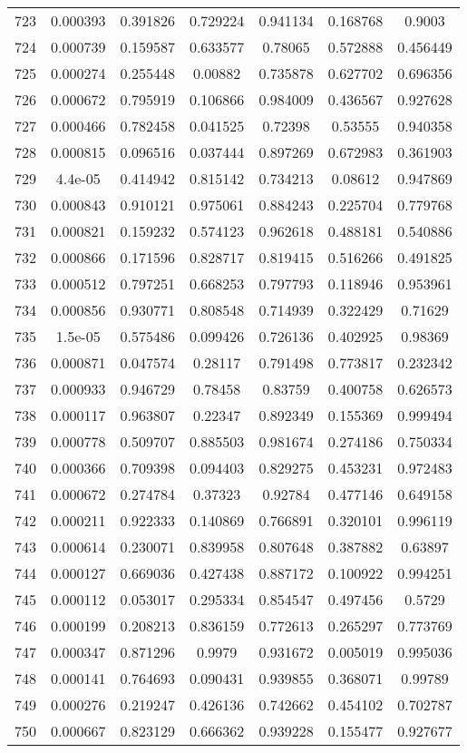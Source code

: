 \begin{table}
\begin{tabular}{c|c|c|c|c|c|c}
723 & 0.000393 & 0.391826 & 0.729224 & 0.941134 & 0.168768 & 0.9003\\
724 & 0.000739 & 0.159587 & 0.633577 & 0.78065 & 0.572888 & 0.456449\\
725 & 0.000274 & 0.255448 & 0.00882 & 0.735878 & 0.627702 & 0.696356\\
726 & 0.000672 & 0.795919 & 0.106866 & 0.984009 & 0.436567 & 0.927628\\
727 & 0.000466 & 0.782458 & 0.041525 & 0.72398 & 0.53555 & 0.940358\\
728 & 0.000815 & 0.096516 & 0.037444 & 0.897269 & 0.672983 & 0.361903\\
729 & 4.4e-05 & 0.414942 & 0.815142 & 0.734213 & 0.08612 & 0.947869\\
730 & 0.000843 & 0.910121 & 0.975061 & 0.884243 & 0.225704 & 0.779768\\
731 & 0.000821 & 0.159232 & 0.574123 & 0.962618 & 0.488181 & 0.540886\\
732 & 0.000866 & 0.171596 & 0.828717 & 0.819415 & 0.516266 & 0.491825\\
733 & 0.000512 & 0.797251 & 0.668253 & 0.797793 & 0.118946 & 0.953961\\
734 & 0.000856 & 0.930771 & 0.808548 & 0.714939 & 0.322429 & 0.71629\\
735 & 1.5e-05 & 0.575486 & 0.099426 & 0.726136 & 0.402925 & 0.98369\\
736 & 0.000871 & 0.047574 & 0.28117 & 0.791498 & 0.773817 & 0.232342\\
737 & 0.000933 & 0.946729 & 0.78458 & 0.83759 & 0.400758 & 0.626573\\
738 & 0.000117 & 0.963807 & 0.22347 & 0.892349 & 0.155369 & 0.999494\\
739 & 0.000778 & 0.509707 & 0.885503 & 0.981674 & 0.274186 & 0.750334\\
740 & 0.000366 & 0.709398 & 0.094403 & 0.829275 & 0.453231 & 0.972483\\
741 & 0.000672 & 0.274784 & 0.37323 & 0.92784 & 0.477146 & 0.649158\\
742 & 0.000211 & 0.922333 & 0.140869 & 0.766891 & 0.320101 & 0.996119\\
743 & 0.000614 & 0.230071 & 0.839958 & 0.807648 & 0.387882 & 0.63897\\
744 & 0.000127 & 0.669036 & 0.427438 & 0.887172 & 0.100922 & 0.994251\\
745 & 0.000112 & 0.053017 & 0.295334 & 0.854547 & 0.497456 & 0.5729\\
746 & 0.000199 & 0.208213 & 0.836159 & 0.772613 & 0.265297 & 0.773769\\
747 & 0.000347 & 0.871296 & 0.9979 & 0.931672 & 0.005019 & 0.995036\\
748 & 0.000141 & 0.764693 & 0.090431 & 0.939855 & 0.368071 & 0.99789\\
749 & 0.000276 & 0.219247 & 0.426136 & 0.742662 & 0.454102 & 0.702787\\
750 & 0.000667 & 0.823129 & 0.666362 & 0.939228 & 0.155477 & 0.927677\\
\end{tabular}
\end{table}
